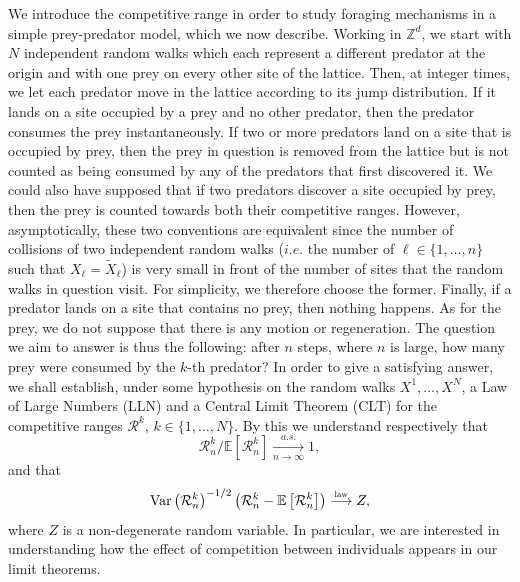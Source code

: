 \documentclass[10pt,a4paper]{amsart}
\newcommand{\R}{\mathcal R}
\newcommand{\EE}{\mathbb E}
\newcommand{\1}{\mathds{1}}
\newcommand{\ZZ}{\mathbb Z}
\newcommand{\distribution}{\stackrel{\scaleto{\mathrm{law}}{4pt}}{\longrightarrow}}
\newcommand{\Var}{\mathrm{Var}}
\numberwithin{equation}{section}
\begin{document}
We introduce the competitive range in order to study foraging mechanisms in a simple prey-predator model, which we now describe. Working in $\ZZ^d$, we start with $N$ independent random walks which each represent a different predator at the origin and with one prey on every other site of the lattice. Then, at integer times, we let each predator move in the lattice according to its jump distribution. If it lands on a site occupied by a prey and no other predator, then the predator consumes the prey instantaneously. If two or more predators land on a site that is occupied by prey, then the prey in question is removed from the lattice but is not counted as being consumed by any of the predators that first discovered it. We could also have supposed that if two predators discover a site occupied by prey, then the prey is counted towards both their competitive ranges. However, asymptotically, these two conventions are equivalent since the number of collisions of two independent random walks ($i.e.$ the number of $\ell\in\{1,\dots,n\}$ such that $X_\ell=\widetilde X_\ell$) is very small in front of the number of sites that the random walks in question visit. For simplicity, we therefore choose the former. Finally, if a predator lands on a site that contains no prey, then nothing happens. As for the prey, we do not suppose that there is any motion or regeneration. The question we aim to answer is thus the following: after $n$ steps, where $n$ is large, how many prey were consumed by the $k$-th predator? In order to give a satisfying answer, we shall establish, under some hypothesis on the random walks $X^1,\dots, X^N$, a Law of Large Numbers (LLN) and a Central Limit Theorem (CLT) for the competitive ranges $\R^k$, $k\in\{1,\dots,N\}$. By this we understand respectively that
\begin{equation*}
    \R_n^k/\EE\left[\R_n^k\right]\underset{n\rightarrow\infty}{\overset{a.s.}\longrightarrow}1,
\end{equation*} 
and that 
\begin{equation*}
    \Var\left(\R_n^k\right)^{-1/2}\left(\R_n^k-\EE\left[\R_n^k\right]\right)\distribution Z,
\end{equation*}
where $Z$ is a non-degenerate random variable. In particular, we are interested in understanding how the effect of competition between individuals appears in our limit theorems.
\end{document}
